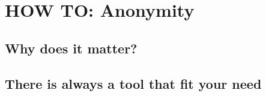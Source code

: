 \documentclass{beamer}
\begin{document}
\section{HOW TO: Anonymity}
\subsection{Why does it matter?}
\begin{frame}
\end{frame}

\subsection{There is always a tool that fit your need}
\begin{frame}
\end{frame}
\end{document}
